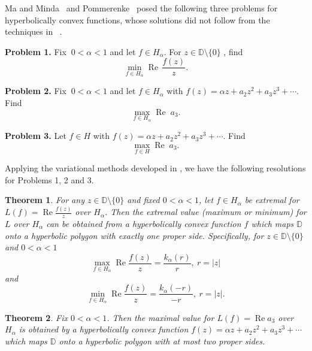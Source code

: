 \documentclass{cmft}
\newcommand{\dsp}{\displaystyle}
\newcommand{\D}{\mathbb{D}}
\newcommand{\al}{\alpha}
\DeclareMathOperator{\re}{Re}
\newtheorem{theorem}{Theorem}[section]
\begin{document}
\vspace{0.1in}

Ma and Minda~\cite{MM94} and Pommerenke~\cite{pomm1} 
posed the following three problems for  
hyperbolically convex functions, whose solutions did not follow from
the techniques in~\cite{PM00,MM94,MM99,MP01,MP02,MP00} .

\vspace{0.1in}

\textbf{Problem 1.}
 Fix $\ 0 < \al < 1$ and let $f \in H_{\al}$.  For $z \in \D\setminus
\{0\}$ , find
\begin{equation}\label{prob1}
\min_{f \in H_{\al}} \re\, \frac{f(z)}{z}.
\end{equation}

\textbf{Problem 2.}
 Fix $\ 0 < \al < 1$ and let $f \in H_\al$ with $f(z) = \al z + a_2z^2 +
a_3z^3 + \cdots$.  Find
\begin{equation}\label{prob2}
\max_{f \in H_{\al}} \re \; a_3.
\end{equation}

\textbf{Problem 3.}
 Let $f \in H$ with $f(z) = \al z + a_2z^2 + a_3z^3 + \cdots$.  Find
\begin{equation}\label{prob3}
\max_{f \in H} \re \; a_3.
\end{equation}

Applying the variational methods developed in \cite{bcpw,bop}, we have the
following resolutions  for Problems 1, 2 and 3.

\begin{theorem}
For any $z \in \D \setminus \{0\}$ and 
fixed  $0 < \al < 1$, let $f \in H_{\al}$ be
extremal for ${\dsp L(f) = \re\frac{f(z)}{z} }$ over $H_{\al}$.  Then the
extremal value (maximum or minimum) for $L$ over $H_{\al}$ can be obtained from a
hyperbolically convex function $f$ which maps $\D$ onto a hyperbolic polygon with
exactly one proper side.  Specifically, for $z \in \D \setminus \{0\}$ and $0 <
\al < 1$
$$\max_{f \in H_{\al}} \re\frac{f(z)}{z} = \frac{k_{\al}(r)}{r},\ r= |z|$$ and
$$\min_{f \in H_{\al}} \re\frac{f(z)}{z} = \frac{k_{\al}(-r)}{-r},\ r= |z|.$$
\end{theorem}

\begin{theorem}\label{T:2}
Fix $0 < \al < 1$. Then the maximal value for $\dsp L(f)=\re a_3$
over $H_{\al}$ is obtained by a hyperbolically convex function $f(z)=
 \al z + a_2z^2 + a_3z^3 + \cdots$ which
maps $\D$ onto a hyperbolic polygon with at most two proper sides.
\end{theorem}
\end{document}
